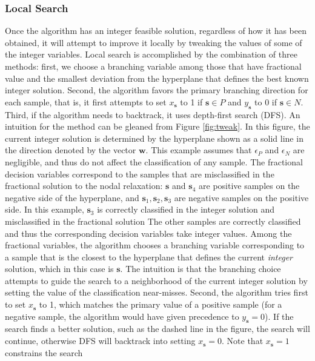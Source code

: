 \documentclass[11pt]{article}
\theoremstyle{definition}
\newcommand{\vect}[1]{\mathbf{#1}}
\newcommand{\sv}[1]{_{\vect{#1}}}
\begin{document}
\subsubsection{Local Search}
\label{sec:localsearch}
Once the algorithm has an integer feasible solution, 
regardless of how it has been obtained,
it will attempt to improve it locally by tweaking 
the values of some of the integer variables.
Local search is accomplished by the combination of three methods:
first, we choose a branching variable among those that have fractional value
and the smallest deviation from the hyperplane that defines the best known
integer solution.
Second, the algorithm favors the primary branching direction
for each sample, that is, it first attempts to set 
$x\sv{s}$ to 1 if $\vect{s} \in P$ and 
$y\sv{s}$ to 0 if $\vect{s} \in N$.
Third, if the algorithm needs to backtrack, it uses depth-first search (DFS).
An intuition for the method can be gleaned from Figure \ref{fig:tweak}.
In this figure, the current integer solution is determined by
the hyperplane shown as a solid line in the direction
denoted by the vector $\vect{w}$.
This example assumes that $\epsilon_P$ and $\epsilon_N$ are negligible,
and thus do not affect the classification of any sample.
The fractional decision variables correspond to the samples
that are misclassified in the fractional solution to the
nodal relaxation: 
$\vect{s}$ and $\vect{s}_4$ are positive samples on the negative
side of the hyperplane, and 
$\vect{s}_1, \vect{s}_2, \vect{s}_3$ are negative samples on the positive side.
In this example, $\vect{s}_3$ is correctly classified in the integer solution
and misclassified in the fractional solution 
The other samples are correctly classified and thus 
the corresponding decision variables take integer values.
Among the fractional variables, 
the algorithm chooses a branching variable corresponding
to a sample that is the closest to the hyperplane that
defines the current {\em integer\/} solution, 
which in this case is $\vect{s}$.
The intuition is that the branching choice attempts to guide the 
search to a neighborhood of the current integer solution
by setting the value of the classification near-misses.
Second, the algorithm tries first to set $x\sv{s}$ to 1,
which matches the primary value of a positive sample
(for a negative sample, the algorithm would have given precedence
to $y\sv{s} = 0$).
If the search finds a better solution, such as the dashed line in
the figure, the search will continue, otherwise DFS will backtrack
into setting $x\sv{s} = 0$.
Note that $x\sv{s} = 1$ constrains the search
\end{document}
